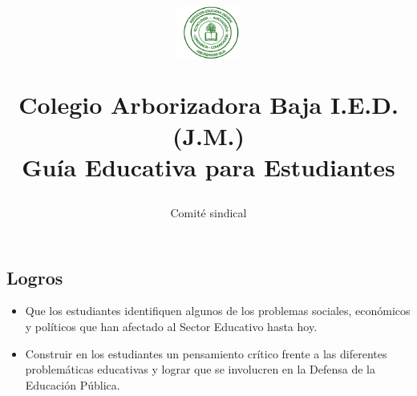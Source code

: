 \documentclass[10pt,twoside]{article}
\author{Comité sindical}
\title{\begin{minipage}{.2\textwidth}
\includegraphics[height=1.75cm]{Images/logo-colegio.png}\end{minipage}
\begin{minipage}{.75\textwidth}
\begin{center}
Colegio Arborizadora Baja I.E.D. (J.M.)\\
Guía Educativa para Estudiantes\\
\end{center}
\end{minipage}\hfill
}
\date{}
\begin{document}
\maketitle
\subsection*{Logros}
\begin{itemize}
\item Que los estudiantes identifiquen algunos de los problemas sociales, económicos y políticos  que han afectado al Sector Educativo hasta hoy.
\item Construir en los estudiantes un pensamiento crítico frente a las diferentes problemáticas educativas y lograr que se involucren en la Defensa de la Educación Pública.
\end{itemize}
\end{document}

